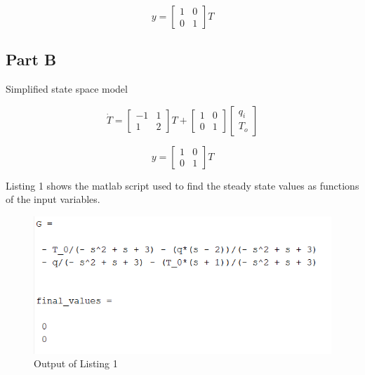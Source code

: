 \documentclass[12pt]{article}
\numberwithin{equation}{subsection}
\begin{document}
  \begin{equation}
    y =
    \begin{bmatrix}
      1 & 0 \\
      0 & 1
    \end{bmatrix}T
  \end{equation}

  \subsection{Part B}

  Simplified state space model

  \begin{equation}
    \dot T =
    \begin{bmatrix}
      -1 & 1 \\
      1 & 2
    \end{bmatrix} T +
    \begin{bmatrix}
      1 & 0\\0 & 1
    \end{bmatrix}
    \begin{bmatrix}
      q_i \\ T_o
    \end{bmatrix}
  \end{equation}

  \begin{equation}
    y =
    \begin{bmatrix}
      1 & 0 \\
      0 & 1
    \end{bmatrix}T
  \end{equation}

  Listing 1 shows the matlab script used to find the steady state values as functions of the input variables.
  \newpage
  

  \begin{figure}
    \centering
    \includegraphics[width=\textwidth]{figures/problem3.png}
    \caption{Output of Listing 1}
    \label{}
  \end{figure}
  \newpage
\end{document}
